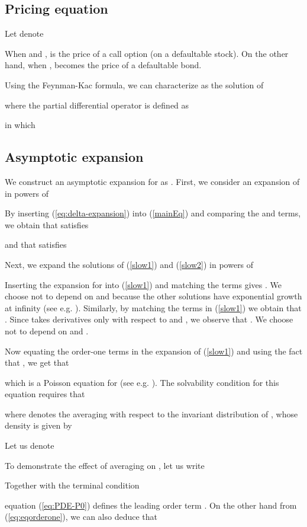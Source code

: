 \documentclass[11pt]{article}
\numberwithin{equation}{section}
\begin{document}
\subsection{Pricing equation}
Let  denote 

When  and ,  is the price of a call option (on a defaultable stock). On the other hand, when ,  becomes the price of a defaultable bond.

Using the Feynman-Kac formula, we can characterize  as the solution of

where the partial differential operator  is defined as 

in which


\subsection{Asymptotic expansion}
We construct an asymptotic expansion for  as .
First, we consider an expansion of  in powers
of 

By inserting (\ref{eq:delta-expansion}) into (\ref{mainEq}) and comparing the  and  terms, we obtain that  satisfies

and that  satisfies


Next, we expand the solutions of (\ref{slow1}) and (\ref{slow2}) in powers of 

Inserting the expansion for  into (\ref{slow1}) and
matching the  terms gives . We choose  not to depend on  and  because the other solutions have exponential growth at infinity (see e.g. \cite{ronnie-timescale}).
Similarly, by matching the  terms in (\ref{slow1}) we obtain that
. Since  takes derivatives only with respect to  and , we observe that . We choose  not to depend on  and .

Now equating the order-one terms in the expansion of (\ref{slow1}) and using the
fact that , we get that

which is a Poisson equation for  (see e.g. \cite{sircar}). The solvability
condition for this equation requires that

where  denotes the averaging with
respect to the invariant distribution of ,
whose density is given by

Let us denote

To demonstrate the effect of averaging on , let us write

Together with the terminal condition

equation (\ref{eq:PDE-P0}) defines the leading order term .
On the other hand from (\ref{eq:eqorderone}), we can also deduce that
\end{document}
